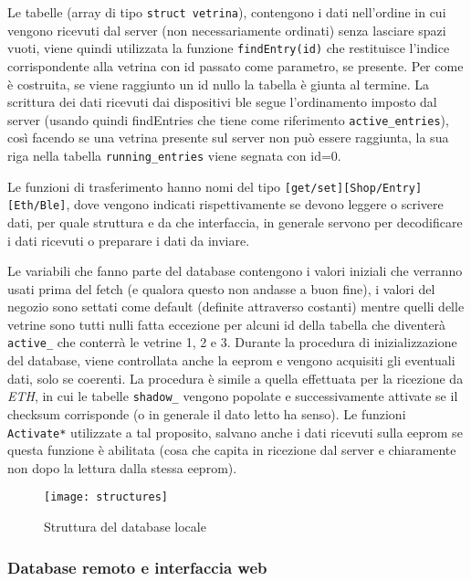 Le tabelle (array di tipo \texttt{struct vetrina}), contengono i dati nell'ordine in cui vengono ricevuti dal server (non necessariamente ordinati) senza lasciare spazi vuoti, viene quindi utilizzata la funzione \texttt{findEntry(id)} che restituisce l'indice corrispondente alla vetrina con id passato come parametro, se presente. Per come \`e costruita, se viene raggiunto un id nullo la tabella \`e giunta al termine. La scrittura dei dati ricevuti dai dispositivi ble segue l'ordinamento imposto dal server (usando quindi findEntries che tiene come riferimento \texttt{active\_entries}), cos\`i facendo se una vetrina presente sul server non pu\`o essere raggiunta, la sua riga nella tabella \texttt{running\_entries} viene segnata con id=0.

Le funzioni di trasferimento hanno nomi del tipo \texttt{[get/set][Shop/Entry][Eth/Ble]}, dove vengono indicati rispettivamente se devono leggere o scrivere dati, per quale struttura e da che interfaccia, in generale servono per decodificare i dati ricevuti o preparare i dati da inviare.

Le variabili che fanno parte del database contengono i valori iniziali che verranno usati prima del fetch (e qualora questo non andasse a buon fine), i valori del negozio sono settati come default (definite attraverso costanti) mentre quelli delle vetrine sono tutti nulli fatta eccezione per alcuni id della tabella che diventer\`a \texttt{active\_} che conterr\`a le vetrine 1, 2 e 3. Durante la procedura di inizializzazione del database, viene controllata anche la eeprom e vengono acquisiti gli eventuali dati, solo se coerenti. La procedura \`e simile a quella effettuata per la ricezione da \textit{ETH}, in cui le tabelle \texttt{shadow\_} vengono popolate e successivamente attivate se il checksum corrisponde (o in generale il dato letto ha senso). Le funzioni \texttt{Activate*} utilizzate a tal proposito, salvano anche i dati ricevuti sulla eeprom se questa funzione \`e abilitata (cosa che capita in ricezione dal server e chiaramente non dopo la lettura dalla stessa eeprom).

\begin{figure}[ht]
	\texttt{[image: structures]}
  \caption{Struttura del database locale}
\end{figure}

\subsubsection{Database remoto e interfaccia web}

